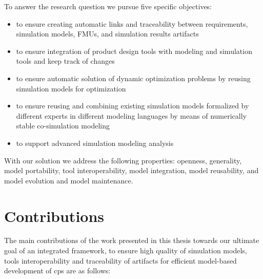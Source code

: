 To answer the research question we pursue five specific objectives: 
\begin{itemize}

 \item to ensure creating automatic links and traceability between requirements, simulation models, FMUs, and simulation results artifacts 
 \item to ensure integration of product design tools with modeling and simulation tools and keep track of changes
 \item to ensure automatic solution of dynamic optimization problems by reusing simulation models for optimization  
 \item to ensure reusing and combining existing simulation models formalized by different experts in different modeling languages by means of numerically stable co-simulation modeling 
 \item to support advanced simulation modeling analysis 

\end{itemize}

With our solution we address the following properties: openness, generality, model portability, tool interoperability, model integration, model reusability, and model evolution and model maintenance.

\section{Contributions}
\label{sec:Contributions}

The main contributions of the work presented in this thesis towards our ultimate goal of an integrated framework, to ensure high quality of simulation models, tools interoperability and traceability of artifacts for efficient model-based development of \acrshort{cps} are as follows:

